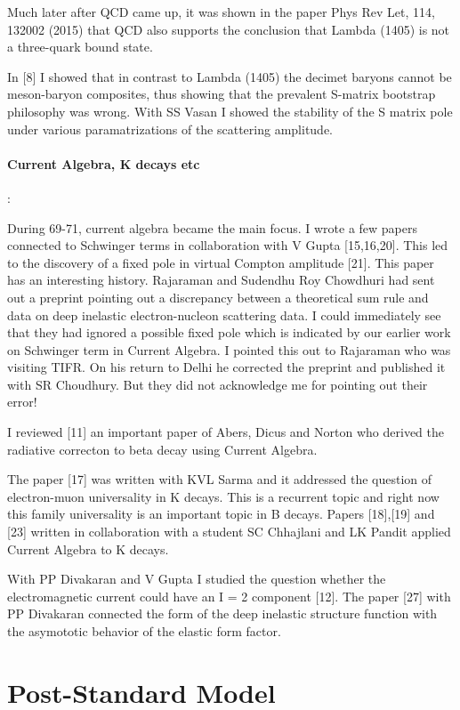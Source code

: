 Much later after QCD came up, it was shown in the paper Phys Rev Let, 
114, 132002 (2015) that QCD also supports the conclusion that Lambda 
(1405) is not a three-quark bound state.

In [8] I showed that in contrast to Lambda (1405) the decimet baryons 
cannot be meson-baryon composites, thus showing that the prevalent 
S-matrix bootstrap philosophy was wrong. With SS Vasan I showed the 
stability of the S matrix pole under various paramatrizations of the 
scattering amplitude.
 
\paragraph{Current Algebra, K decays etc}:

During 69-71, current algebra became the main focus. I wrote a few 
papers connected to Schwinger terms in collaboration with V Gupta 
[15,16,20]. This led to the discovery of a fixed pole in virtual Compton 
amplitude [21]. This paper has an interesting history. Rajaraman and 
Sudendhu Roy Chowdhuri had sent out a preprint pointing out a 
discrepancy between a theoretical sum rule and data on deep inelastic 
electron-nucleon scattering data. I could immediately see that they had 
ignored a possible fixed pole which is indicated by our earlier work on 
Schwinger term in Current Algebra. I pointed this out to Rajaraman who 
was visiting TIFR. On his return to Delhi he corrected the preprint and 
published it with SR Choudhury. But they did not acknowledge me for 
pointing out their error!

I reviewed [11] an important paper of Abers, Dicus and Norton who 
derived the radiative correcton to beta decay using Current Algebra.

The paper [17] was written with KVL Sarma and it addressed the question 
of electron-muon universality in K decays. This is a recurrent topic and 
right now this family universality is an important topic in B decays. 
Papers [18],[19] and [23] written in collaboration with a student SC 
Chhajlani and LK Pandit applied Current Algebra to K decays.

With PP Divakaran and V Gupta I studied the question whether the 
electromagnetic current could have an I = 2 component [12]. The paper 
[27] with PP Divakaran connected the form of the deep inelastic 
structure function with the asymototic behavior of the elastic form 
factor.

\section*{Post-Standard Model}

